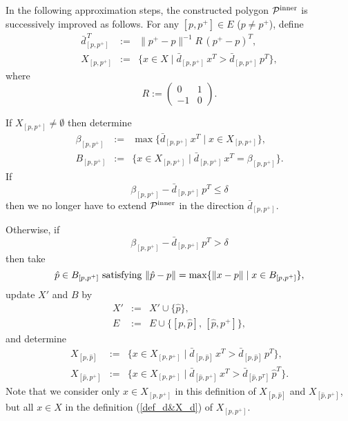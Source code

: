 \documentclass[12pt]{article}
\begin{document}
In the following approximation steps, the constructed polygon ${\cal P}^{\rm inner}$ is successively
improved as follows.
For any $[p, p^+] \in E$ ($p \not= p^+$), define
\begin{equation}\label{def_d&X_d}
\begin{array}{lcl}
\bar d_{[p, p^+]}^{\, T} &:=& \|p^+ - p\|^{-1} R \, (p^+ - p)^T, \\
X_{[p, p^+]} &:=& \{x \in X \mid \bar d_{[p, p^+]}\, x^T > \bar d_{[p, p^+]}\, p^T \},
\end{array}
\end{equation}
where
\begin{equation*}%
R := \begin{pmatrix}
0 & 1 \\
-1 & 0
\end{pmatrix}.
\end{equation*}

If $X_{[p, p^+]} \not= \emptyset$ then determine
\begin{equation}\label{beta1}
\begin{array}{lcl}
\beta_{[p, p^+]} &:=& \max \{\bar d_{[p, p^+]}\, x^T \mid x \in X_{[p, p^+]}\}, \\
B_{[p, p^+]} &:=& \{x \in X_{[p, p^+]} \mid \bar d_{[p, p^+]}\, x^T = \beta_{[p, p^+]}\}.
\end{array}
\end{equation}
If 
\begin{equation}\label{beta2}
\beta_{[p, p^+]} - \bar d_{[p, p^+]}\, p^T \leq \delta
\end{equation}
then we no longer have to extend ${\cal P}^{\rm inner }$ in the direction $\bar d_{[p, p^+]}$.

Otherwise, if 
\begin{equation}\label{beta3}
\beta_{[p, p^+]} - \bar d_{[p, p^+]}\, p^T > \delta
\end{equation}
then take   
\begin{equation}\label{beta4}
\hat p \in B_{[p, p^+]} \hbox{ satisfying } \|\hat p - p\| = \max\{\|x - p\| \mid x \in B_{[p, p^+]}\},
\end{equation}
update $X'$ and $B$ by
\begin{equation}\label{beta5}
\begin{array}{lcl}
X' &:=& X' \cup \{\hat p\}, \\
E &:=& E \cup \{[p, \hat p], \, [\hat p, p^+]\},
\end{array}
\end{equation}
and determine
\begin{equation}\label{beta6}
\begin{array}{lcl}
X_{[p, \hat p]} &:=& \{x \in X_{[p, p^+]} \mid \bar d_{[p, \hat p]}\, x^T > \bar d_{[p, \hat p]}\, p^T \}, \\
X_{[\hat p, p^+]} &:=& \{x \in X_{[p, p^+]} \mid \bar d_{[\hat p, p^+]}\, x^T > \bar d_{[\hat p, p^T]}\, {\hat p}^T \}.
\end{array}
\end{equation}
Note that we consider only $x \in X_{[p, p^+]}$ in this definition of $X_{[p, \hat p]}$ and $X_{[\hat p, p^+]}$, but all $x \in X$ in the definition (\ref{def_d&X_d}) of $X_{[p, p^+]}$.
\end{document}
